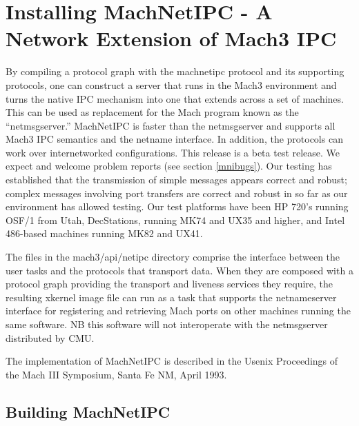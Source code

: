 %     
%
%
%
%
%
%
%



\section{Installing MachNetIPC - A Network Extension of Mach3 IPC}
\label{installmni}

By compiling a protocol graph with the machnetipc protocol
and its supporting protocols, one can construct a server that
runs in the Mach3 environment and turns the native IPC mechanism into
one that extends across a set of machines.
This can be used as replacement for the Mach program known as
the ``netmsgserver.''  MachNetIPC is faster than the
netmsgserver and supports all Mach3 IPC semantics and the netname
interface.  In addition, the protocols can work over internetworked
configurations.  This release is a beta test release.  We
expect and welcome problem reports (see section \ref{mnibugs}).  Our testing
has established that the transmission of simple messages appears
correct and robust; complex messages involving port transfers are
correct and robust in so far as our environment has allowed testing.
Our test platforms have been HP 720's running OSF/1 from Utah,
DecStations, running MK74 and UX35 and higher, and Intel 486-based
machines running MK82 and UX41.

The files in the mach3/api/netipc directory comprise the interface
between the user tasks and the protocols that transport data.  When
they are composed with a protocol graph providing the transport
and liveness services they require,
the resulting {\sanss xkernel} image file can run as a task that supports
the netnameserver interface for registering and retrieving Mach ports
on other machines running the same software.  NB this software will not
interoperate with the netmsgserver distributed by CMU.

The implementation of MachNetIPC is described in the Usenix Proceedings of
the Mach III Symposium, Santa Fe NM, April 1993.


\subsection{Building MachNetIPC}

